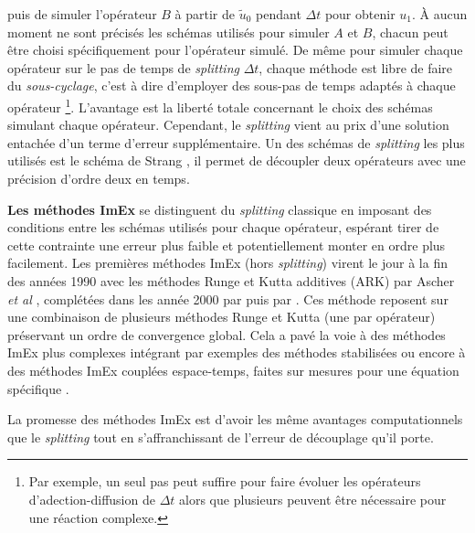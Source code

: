         puis de simuler l'opérateur $B$ à partir de $\tilde{u}_0$ pendant $\Delta t$ pour obtenir $u_1$.
        À aucun moment ne sont précisés les schémas utilisés pour simuler $A$ et $B$, chacun peut être choisi spécifiquement pour l'opérateur simulé.
        De même pour simuler chaque opérateur sur le pas de temps de \emph{splitting} $\Delta t$, chaque méthode est libre de faire du \emph{sous-cyclage},
        c'est à dire d'employer des sous-pas de temps adaptés à chaque opérateur
        \footnote{Par exemple, un seul pas peut suffire pour faire évoluer les opérateurs d'adection-diffusion
        de $\Delta t$ alors que plusieurs peuvent être nécessaire pour une réaction complexe.}.
        L'avantage est la liberté totale concernant le choix des schémas simulant chaque opérateur.
        Cependant, le \textit{splitting} vient au prix d'une solution entachée d'un terme d'erreur supplémentaire.
        Un des schémas de \textit{splitting} les plus utilisés est le schéma de Strang \cite{Strang1968}, 
        il permet de découpler deux opérateurs avec une précision d'ordre deux en temps.\par
        \textbf{Les méthodes ImEx} se distinguent du \textit{splitting} classique en imposant des conditions entre les schémas utilisés pour chaque opérateur, 
        espérant tirer de cette contrainte une erreur plus faible et potentiellement monter en ordre plus facilement.
        Les premières méthodes ImEx (hors \textit{splitting}) virent le jour à la fin des années 1990 
        avec les méthodes Runge et Kutta additives (ARK) par Ascher \textit{et al} \cite{ASCHER1997151},
        complétées dans les année 2000 par \cite{KENNEDY2003139} puis par \cite{pareschi2010implicitexplicitrungekuttaschemesapplications}.
        Ces méthode reposent sur une combinaison de plusieurs méthodes Runge et Kutta (une par opérateur) préservant un ordre de convergence global.
        Cela a pavé la voie à des méthodes ImEx plus complexes intégrant par exemples des méthodes stabilisées \cite{Abdulle2013} 
        ou encore à des méthodes ImEx couplées espace-temps, faites sur mesures pour une équation spécifique \cite{rebou2024}.\par 
        La promesse des méthodes ImEx est d'avoir les même avantages computationnels que le \emph{splitting} tout en s'affranchissant de l'erreur de découplage qu'il porte.
